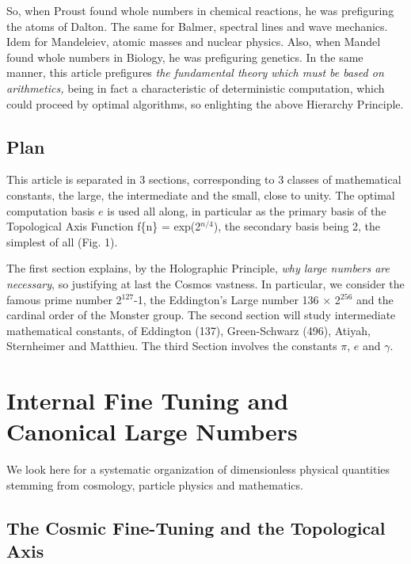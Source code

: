 \documentclass[twoside,draft]{article}
\begin{document}
\begin{sloppypar}
{So, when Proust found whole numbers in chemical reactions, he was prefiguring the atoms of Dalton. The same for Balmer, spectral lines and wave mechanics. Idem for Mandeleiev, atomic masses and nuclear physics. Also, when Mandel found whole numbers in Biology, he was prefiguring genetics. In the same manner, this article prefigures \textit{the fundamental theory which must be based on arithmetics,} being in fact a characteristic of deterministic computation, which could proceed by optimal algorithms, so enlighting the above Hierarchy Principle.

\subsection{Plan}
This article is separated in 3 sections, corresponding to 3 classes of mathematical constants, the large, the intermediate and the small, close to unity. The optimal computation basis $e$ is used all along, in particular as the primary basis of the Topological Axis Function f\{n\} = exp(2$^{n/4}$), the secondary basis being 2, the simplest of all (Fig. 1).

The first section explains, by the Holographic Principle, \textit{why large numbers are necessary}, so justifying at last the Cosmos vastness. In particular, we consider the famous prime number 2$^{127}\!$-1, the Eddington's Large number 136 $\times$ 2$^{256}\!$ and the cardinal order of the Monster group. The second section will study intermediate mathematical constants, of Eddington (137), Green-Schwarz (496), Atiyah, Sternheimer and Matthieu. The third Section involves the constants $\pi$, $e$ and $\gamma$. 

\section {Internal Fine Tuning and Canonical Large Numbers}
We look here for a systematic organization of dimensionless physical quantities stemming from cosmology, particle physics and mathematics.
\subsection {The Cosmic Fine-Tuning and the Topological Axis}

}
\end{sloppypar}
\end{document}
